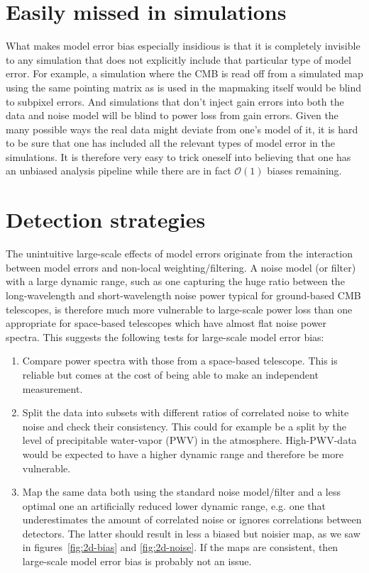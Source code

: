 \documentclass[twocolumn,apj]{aastex63}
\begin{document}
\section{Easily missed in simulations}
What makes model error bias especially insidious is that
it is completely invisible to any simulation that does not explicitly include
that particular type of model error. For example, a simulation where the CMB
is read off from a simulated map using the same pointing matrix as is used
in the mapmaking itself would be blind to subpixel errors. And simulations that
don't inject gain errors into both the data and noise model will be blind to
power loss from gain errors. Given the many
possible ways the real data might deviate from one's model of it, it is hard
to be sure that one has included all the relevant types of model error in the simulations.
It is therefore very easy to trick oneself into believing that one has an
unbiased analysis pipeline while there are in fact $\mathcal{O}(1)$ biases remaining.

\section{Detection strategies}
The unintuitive large-scale effects of model errors originate from the interaction
between model errors and non-local weighting/filtering. A noise model (or filter) with
a large dynamic range, such as one capturing the huge ratio between the long-wavelength
and short-wavelength noise power typical for ground-based CMB telescopes, is therefore
much more vulnerable to large-scale power loss than one appropriate for
space-based telescopes which have almost flat noise power spectra. This suggests
the following tests for large-scale model error bias:
\begin{enumerate}
	\item Compare power spectra with those from a space-based telescope.
		This is reliable but comes at the cost of being able to make an independent measurement.
	\item Split the data into subsets with different ratios of correlated noise to white noise
		and check their consistency. This could for example be a split by the
		level of precipitable water-vapor (PWV) in the atmosphere. High-PWV-data
		would be expected to have a higher dynamic range and therefore be more vulnerable.
	\item Map the same data both using the standard noise model/filter and a
		less optimal one an artificially reduced lower dynamic range, e.g. one that
		underestimates the amount of correlated noise or ignores correlations between
		detectors. The latter should result in less a biased but noisier map, as we saw
		in figures~\ref{fig:2d-bias} and \ref{fig:2d-noise}.
		If the maps are consistent, then large-scale model error bias is probably not an issue.
\end{enumerate}
\end{document}
